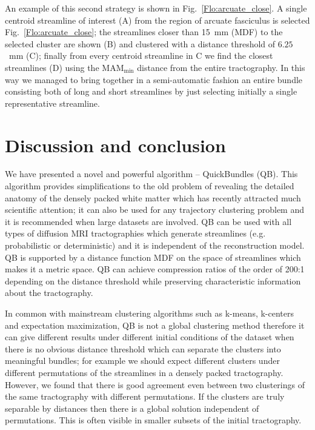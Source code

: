 \documentclass{bioinfo}
\begin{document}
An example of this second strategy is shown in
Fig.~\ref{Flo:arcuate_close}. A single centroid streamline of interest
(A) from the region of arcuate fasciculus is selected
Fig.~\ref{Flo:arcuate_close}; the streamlines closer than 15~mm (MDF) to
the selected cluster are shown (B) and clustered with a distance
threshold of $6.25$~mm (C); finally from every centroid streamline in C
we find the closest streamlines (D) using the
$\textrm{MAM}_{\textrm{min}}$ distance from the entire tractography. In
this way we managed to bring together in a semi-automatic fashion an
entire bundle consisting both of long and short streamlines by just
selecting initially a single representative streamline.

\section{Discussion and conclusion}

We have presented a novel and powerful algorithm -- QuickBundles
(QB). This algorithm provides simplifications to the old problem of
revealing the detailed anatomy of the densely packed white matter which
has recently attracted much scientific attention; it can also be used
for any trajectory clustering problem and it is recommended when large
datasets are involved. QB can be used with all types of diffusion MRI
tractographies which generate streamlines (e.g. probabilistic or
deterministic) and it is independent of the reconstruction model. QB is
supported by a distance function MDF on the space of streamlines which
makes it a metric space. QB can achieve compression ratios of the order
of 200:1 depending on the distance threshold while preserving
characteristic information about the tractography.

In common with mainstream clustering algorithms such as k-means,
k-centers and expectation maximization, QB is not a global clustering
method therefore it can give different results under different initial
conditions of the dataset when there is no obvious distance threshold
which can separate the clusters into meaningful bundles; for example we
should expect different clusters under different permutations of the
streamlines in a densely packed tractography. However, we found that
there is good agreement even between two clusterings of the same
tractography with different permutations. If the clusters are truly
separable by distances then there is a global solution independent of
permutations. This is often visible in smaller subsets of the initial
tractography.
\end{document}
